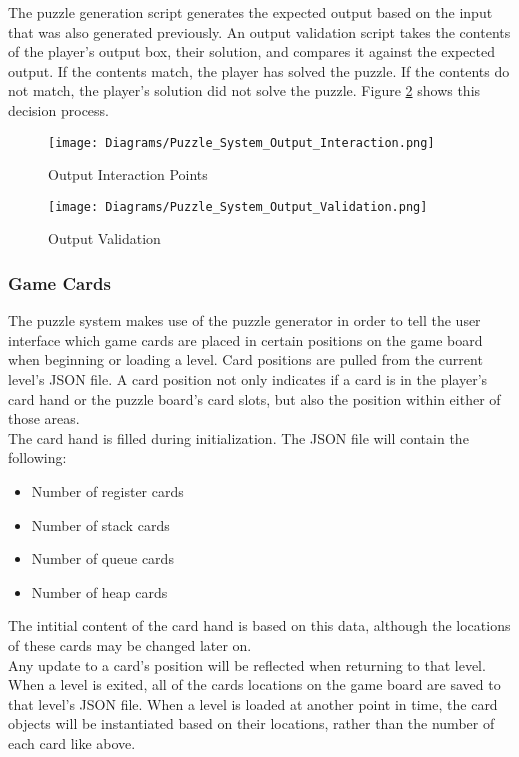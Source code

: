 The puzzle generation script generates the expected output based on the input that
was also generated previously. An output validation script takes the contents of
the player's output box, their solution, and compares it against the expected output.
If the contents match, the player has solved the puzzle. If the contents do not match,
the player's solution did not solve the puzzle. Figure \ref{fig:Puzzle_System_Output_Validation} shows this decision process.

\begin{figure}[!hb]
  \caption{Output Interaction Points}
  \label{fig:Puzzle_System_Output_Interaction}
  \centering
  \texttt{[image: Diagrams/Puzzle\_System\_Output\_Interaction.png]}
\end{figure}

\begin{figure}[!hb]
  \caption{Output Validation}
  \label{fig:Puzzle_System_Output_Validation}
  \centering
  \texttt{[image: Diagrams/Puzzle\_System\_Output\_Validation.png]}
\end{figure}
\vfill
\clearpage

\subsubsection{Game Cards}
The puzzle system makes use of the puzzle generator in order to tell the user interface
which game cards are placed in certain positions on the game board when beginning
or loading a level. Card positions are pulled from the current level's JSON file.
A card position not only indicates if a card is in the player's card hand or the puzzle board's
card slots, but also the position within either of those areas.\\

The card hand is filled during initialization. The JSON file will contain the following:
\begin{itemize}
   \item Number of register cards
   \item Number of stack cards
   \item Number of queue cards
   \item Number of heap cards
\end{itemize}

The intitial content of the card hand is based on this data, although the locations
of these cards may be changed later on.\\

Any update to a card's position will be reflected when returning to that level.
When a level is exited, all of the cards locations on the game board are saved to
that level's JSON file. When a level is loaded at another point in time, the card
objects will be instantiated based on their locations, rather than the number of
each card like above.\\

